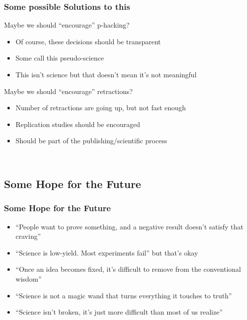 \documentclass{beamer} %
\newcommand{\1}{\mathbb{1}}
\begin{document}
\begin{frame}[t]\frametitle{Some possible Solutions to this}

Maybe we should ``encourage'' p-hacking?
\begin{itemize}
	\item Of course, these decisions should be transparent
	\item Some call this pseudo-science
	\item This isn't science but that doesn't mean it's not meaningful 
\end{itemize}
\vspace{3mm}
Maybe we should ``encourage'' retractions?
\begin{itemize}
	\item Number of retractions are going up, but not fast enough
	\item Replication studies should be encouraged
	\item Should be part of the publishing/scientific process
\end{itemize}

\href{http://fivethirtyeight.com/features/science-isnt-broken/}
{}\\	
\end{frame}



\subsection{Some Hope for the Future}

\begin{frame}[t]\frametitle{Some Hope for the Future}

\begin{itemize}
	\item ``People want to prove something, and a negative result doesn’t satisfy that craving'' %
	\item ``Science is low-yield. Most experiments fail'' but that's okay %
	\item ``Once an idea becomes fixed, it’s difficult to remove from the conventional wisdom'' %
	\item ``Science is not a magic wand that turns everything it touches to truth'' %
	\item ``Science isn’t broken, it’s just more difficult than most of us realize'' %
\end{itemize}

\vspace{3mm}

\end{frame}
\end{document}
